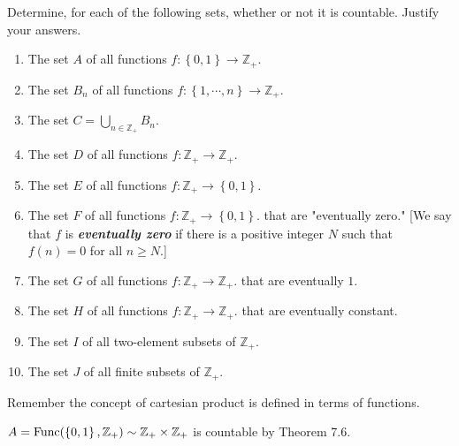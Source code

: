 \documentclass[a4paper,12pt]{article}
\begin{document}
\begin{exe}
	Determine, for each of the following sets,
	whether or not it is countable.
	Justify your answers.
	\begin{enumerate}
		\item
		      The set \( A \) of all functions
		      \( f:\left\{ 0,1 \right\} \to \mathbb{Z}_{+} \).
		      
		\item
		      The set \( B_n \) of all functions
		      \( f:\left\{ 1,\cdots,n \right\} \to \mathbb{Z}_{+} \).
		      
		\item
		      The set \( C=\bigcup_{n \in \mathbb{Z}_{+}}B_n \).
		      
		\item
		      The set \( D \) of all functions
		      \( f:\mathbb{Z}_{+} \to \mathbb{Z}_{+} \).
		      
		\item
		      The set \( E \) of all functions
		      \( f:\mathbb{Z}_{+} \to \left\{ 0,1 \right\} \).
		      
		\item
		      The set \( F \) of all functions
		      \( f:\mathbb{Z}_{+} \to \left\{ 0,1 \right\} \).
		      that are "eventually zero."
		      [We say that \( f \) is \textbf{\textit{eventually zero}} if there is a positive integer \( N \) such that \( f(n)=0 \) for all \( n \ge N \).]
		      
		\item
		      The set \( G \) of all functions
		      \( f:\mathbb{Z}_{+} \to \mathbb{Z}_{+} \).
		      that are eventually \( 1 \).
		      
		\item
		      The set \( H \) of all functions
		      \( f:\mathbb{Z}_{+} \to \mathbb{Z}_{+} \).
		      that are eventually constant.
		      
		\item
		      The set \( I \) of all two-element subsets of \( \mathbb{Z}_{+} \).
		      
		\item
		      The set \( J \) of all finite subsets of \( \mathbb{Z}_{+} \).
	\end{enumerate}
	
\end{exe}\begin{sol}
	Remember the concept of cartesian product is defined in terms of functions.
	
	\( A=\mathrm{Func}(\left\{ 0,1 \right\},\mathbb{Z}_{+})
	\sim \mathbb{Z}_{+}\times \mathbb{Z}_{+} \)
	is countable by Theorem 7.6.
	

\end{sol}
\end{document}
